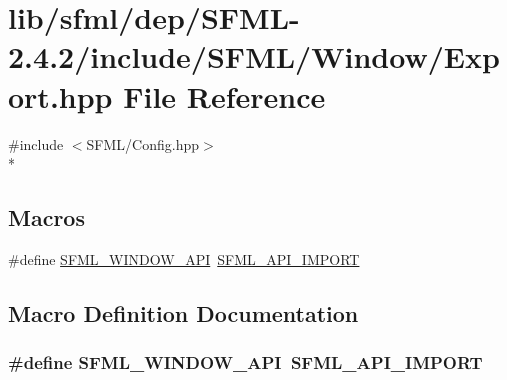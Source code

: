 \hypertarget{sfml_2dep_2_s_f_m_l-2_84_82_2include_2_s_f_m_l_2_window_2_export_8hpp}{\section{lib/sfml/dep/\-S\-F\-M\-L-\/2.4.2/include/\-S\-F\-M\-L/\-Window/\-Export.hpp File Reference}
\label{sfml_2dep_2_s_f_m_l-2_84_82_2include_2_s_f_m_l_2_window_2_export_8hpp}
}
{\ttfamily \#include $<$S\-F\-M\-L/\-Config.\-hpp$>$}\\*
\subsection*{Macros}
\begin{DoxyCompactItemize}
\item 
\#define \hyperlink{sfml_2dep_2_s_f_m_l-2_84_82_2include_2_s_f_m_l_2_window_2_export_8hpp_a1ab885b7907ee088350359516d68be64}{S\-F\-M\-L\-\_\-\-W\-I\-N\-D\-O\-W\-\_\-\-A\-P\-I}~\hyperlink{sfml_2dep_2_s_f_m_l-2_84_82_2include_2_s_f_m_l_2_config_8hpp_aba0bbe5791bee6633caa835c7f6a12a4}{S\-F\-M\-L\-\_\-\-A\-P\-I\-\_\-\-I\-M\-P\-O\-R\-T}
\end{DoxyCompactItemize}


\subsection{Macro Definition Documentation}
\hypertarget{sfml_2dep_2_s_f_m_l-2_84_82_2include_2_s_f_m_l_2_window_2_export_8hpp_a1ab885b7907ee088350359516d68be64}{
\subsubsection[{S\-F\-M\-L\-\_\-\-W\-I\-N\-D\-O\-W\-\_\-\-A\-P\-I}]{\setlength{\rightskip}{0pt plus 5cm}\#define S\-F\-M\-L\-\_\-\-W\-I\-N\-D\-O\-W\-\_\-\-A\-P\-I~{\bf S\-F\-M\-L\-\_\-\-A\-P\-I\-\_\-\-I\-M\-P\-O\-R\-T}}}\label{sfml_2dep_2_s_f_m_l-2_84_82_2include_2_s_f_m_l_2_window_2_export_8hpp_a1ab885b7907ee088350359516d68be64}
